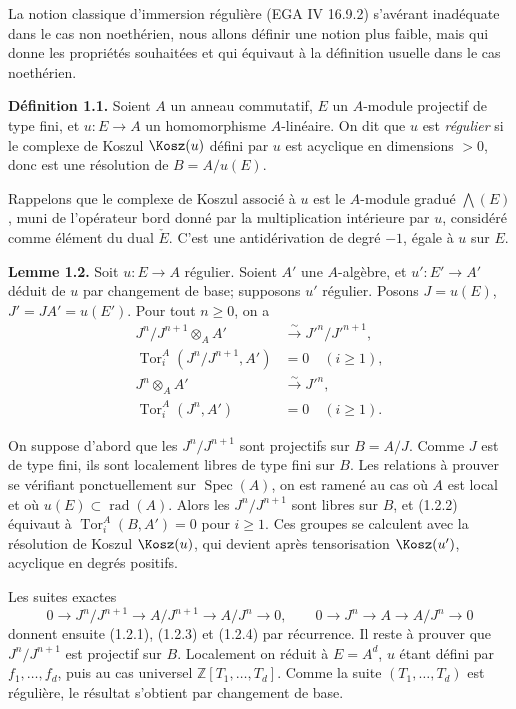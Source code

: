 \documentclass[11pt]{article}
\newcommand{\Tor}{\operatorname{Tor}}
\newcommand{\Spec}{\operatorname{Spec}}
\providecommand{\rad}{\operatorname{rad}}
\providecommand{\Tor}{\operatorname{Tor}}
\begin{document}
La notion classique d'immersion régulière (EGA IV 16.9.2) s'avérant inadéquate dans le cas non noethérien, nous allons définir une notion plus faible, mais qui donne les propriétés souhaitées et qui équivaut à la définition usuelle dans le cas noethérien.

\textbf{Définition 1.1.} Soient \(A\) un anneau commutatif, \(E\) un \(A\)-module projectif de type fini, et \(u:E\to A\) un homomorphisme \(A\)-linéaire. On dit que \(u\) est \emph{régulier} si le complexe de Koszul \(\Kosz(u)\) défini par \(u\) est acyclique en dimensions \(>0\), donc est une résolution de \(B=A/u(E)\).

Rappelons que le complexe de Koszul associé à \(u\) est le \(A\)-module gradué \(\bigwedge(E)\), muni de l'opérateur bord donné par la multiplication intérieure par \(u\), considéré comme élément du dual \(\check E\). C'est une antidérivation de degré \(-1\), égale à \(u\) sur \(E\).

\textbf{Lemme 1.2.} Soit \(u:E\to A\) régulier. Soient \(A'\) une \(A\)-algèbre, et \(u':E'\to A'\) déduit de \(u\) par changement de base; supposons \(u'\) régulier. Posons \(J=u(E)\), \(J'=JA'=u(E')\). Pour tout \(n\ge0\), on a
\begin{align}
 J^n/J^{n+1}\otimes_AA'&\xrightarrow{\sim}J'^n/J'^{n+1}, \tag{1.2.1}\\
 \Tor_i^A(J^n/J^{n+1},A')&=0\quad(i\ge1), \tag{1.2.2}\\
 J^n\otimes_AA'&\xrightarrow{\sim}J'^n, \tag{1.2.3}\\
 \Tor_i^A(J^n,A')&=0\quad(i\ge1). \tag{1.2.4}
\end{align}

On suppose d'abord que les \(J^n/J^{n+1}\) sont projectifs sur \(B=A/J\). Comme \(J\) est de type fini, ils sont localement libres de type fini sur \(B\). Les relations à prouver se vérifiant ponctuellement sur \(\Spec(A)\), on est ramené au cas où \(A\) est local et où \(u(E)\subset\rad(A)\). Alors les \(J^n/J^{n+1}\) sont libres sur \(B\), et (1.2.2) équivaut à \(\Tor_i^A(B,A')=0\) pour \(i\ge1\). Ces groupes se calculent avec la résolution de Koszul \(\Kosz(u)\), qui devient après tensorisation \(\Kosz(u')\), acyclique en degrés positifs.

Les suites exactes
\[
0\to J^n/J^{n+1}\to A/J^{n+1}\to A/J^n\to0,
\qquad
0\to J^n\to A\to A/J^n\to0
\]
donnent ensuite (1.2.1), (1.2.3) et (1.2.4) par récurrence. Il reste à prouver que \(J^n/J^{n+1}\) est projectif sur \(B\). Localement on réduit à \(E=A^d\), \(u\) étant défini par \(f_1,\ldots,f_d\), puis au cas universel \(\mathbb Z[T_1,\ldots,T_d]\). Comme la suite \((T_1,\ldots,T_d)\) est régulière, le résultat s'obtient par changement de base.
\end{document}
